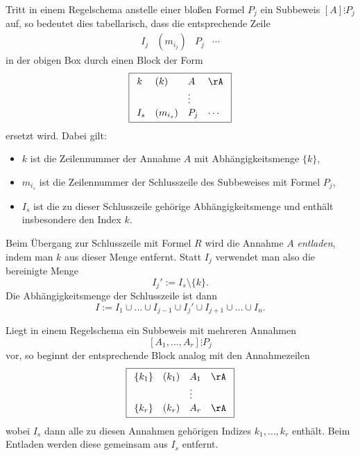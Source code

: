 \documentclass[main.tex]{subfiles}
\begin{document}
Tritt in einem Regelschema anstelle einer bloßen Formel \(P_j\) ein
Subbeweis \([A]\vdots P_j\) auf, so bedeutet dies tabellarisch, dass
die entsprechende Zeile
\[
  \begin{array}{llll}
    I_j & (m_{i_j}) & P_j & \cdots
  \end{array}
\]
in der obigen Box durch einen Block der Form
\[
\boxed{%
  \begin{array}{llll}
    k   & (k)       & A   & \rA   \\[0.2ex]
        &           &\vdots&      \\[0.2ex]
    I_s & (m_{i_s}) & P_j & \cdots
  \end{array}
}
\]
ersetzt wird. Dabei gilt:
\begin{itemize}
  \item \(k\) ist die Zeilennummer der Annahme \(A\) mit
        Abhängigkeitsmenge \(\{k\}\),
  \item \(m_{i_s}\) ist die Zeilennummer der Schlusszeile des Subbeweises
        mit Formel \(P_j\),
  \item \(I_s\) ist die zu dieser Schlusszeile gehörige
        Abhängigkeitsmenge und enthält insbesondere den Index \(k\).
\end{itemize}
Beim Übergang zur Schlusszeile mit Formel \(R\) wird die Annahme
\(A\) \emph{entladen}, indem man \(k\) aus dieser Menge entfernt.
Statt \(I_j\) verwendet man also die bereinigte Menge
\[
  I_j' := I_s \setminus \{k\}.
\]
Die Abhängigkeitsmenge der Schlusszeile ist dann
\[
  I := I_1 \cup \dots \cup I_{j-1} \cup I_j' \cup I_{j+1} \cup \dots \cup I_n.
\]

\medskip

Liegt in einem Regelschema ein Subbeweis mit mehreren Annahmen
\[
  [A_1,\dots,A_r]\vdots P_j
\]
vor, so beginnt der entsprechende Block analog mit den Annahmezeilen
\[
\boxed{%
  \begin{array}{llll}
    \{k_1\} & (k_1) & A_1 & \rA \\[0.2ex]
           &       &\vdots&     \\[0.2ex]
    \{k_r\} & (k_r) & A_r & \rA
  \end{array}
}
\]
wobei \(I_s\) dann alle zu diesen Annahmen gehörigen Indizes
\(k_1,\dots,k_r\) enthält. Beim Entladen werden diese gemeinsam aus
\(I_s\) entfernt.

\medskip
\end{document}
